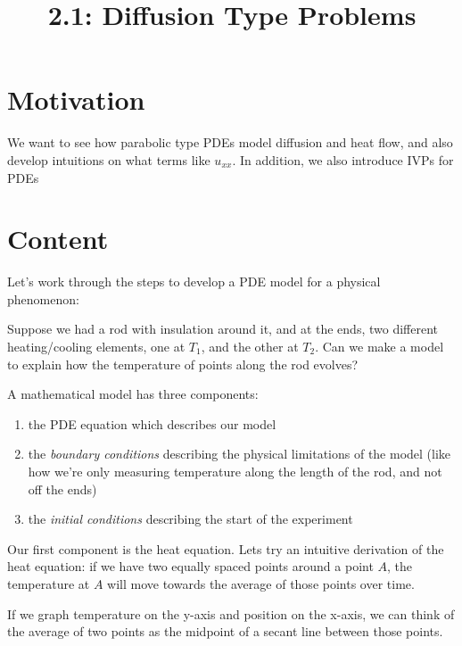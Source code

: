 \documentclass{article}
\title{2.1: Diffusion Type Problems}
\begin{document}
\maketitle
\section{Motivation}

We want to see how parabolic type PDEs model diffusion and heat flow, and also develop intuitions on what terms like $u_{xx}$. In addition, we also introduce IVPs for PDEs

\section{Content}

Let's work through the steps to develop a PDE model for a physical phenomenon:

\begin{example}
Suppose we had a rod with insulation around it, and at the ends, two different heating/cooling elements, one at $T_1$, and the other at $T_2$. Can we make a model to explain how the temperature of points along the rod evolves?
\end{example}

A mathematical model has three components: 
\begin{enumerate}
    \item the PDE equation which describes our model
    \item the \textit{boundary conditions} describing the physical limitations of the model (like how we're only measuring temperature along the length of the rod, and not off the ends)
    \item the \textit{initial conditions} describing the start of the experiment
\end{enumerate}

Our first component is the heat equation. Lets try an intuitive derivation of the heat equation: if we have two equally spaced points around a point $A$, the temperature at $A$ will move towards the average of those points over time.

If we graph temperature on the y-axis and position on the x-axis, we can think of the average of two points as the midpoint of a secant line between those points. 
\end{document}
